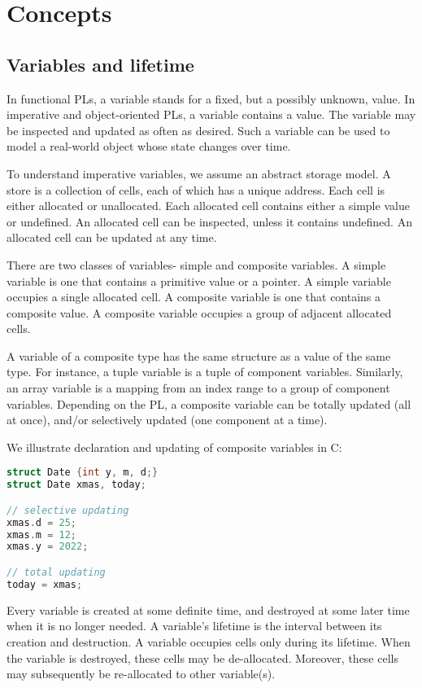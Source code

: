 \documentclass[a4paper, openany]{memoir}
\begin{document}
\chapter{Concepts}

\section{Variables and lifetime}
In functional PLs, a variable stands for a fixed, but a possibly unknown, value. In imperative and object-oriented PLs, a variable contains a value. The variable may be inspected and updated as often as desired. Such a variable can be used to model a real-world object whose state changes over time.

To understand imperative variables, we assume an abstract storage model. A store is a collection of cells, each of which has a unique address. Each cell is either allocated or unallocated. Each allocated cell contains either a simple value or undefined. An allocated cell can be inspected, unless it contains undefined. An allocated cell can be updated at any time.

There are two classes of variables- simple and composite variables. A simple variable is one that contains a primitive value or a pointer. A simple variable occupies a single allocated cell. A composite variable is one that contains a composite value. A composite variable occupies a group of adjacent allocated cells.

A variable of a composite type has the same structure as a value of the same type. For instance, a tuple variable is a tuple of component variables. Similarly, an array variable is a mapping from an index range to a group of component variables. Depending on the PL, a composite variable can be totally updated (all at once), and/or selectively updated (one component at a time).

We illustrate declaration and updating of composite variables in C:
\begin{lstlisting}[language=C]
struct Date {int y, m, d;}
struct Date xmas, today;

// selective updating
xmas.d = 25;
xmas.m = 12;
xmas.y = 2022;

// total updating
today = xmas;
\end{lstlisting}

Every variable is created at some definite time, and destroyed at some later time when it is no longer needed. A variable's lifetime is the interval between its creation and destruction. A variable occupies cells only during its lifetime. When the variable is destroyed, these cells may be de-allocated. Moreover, these cells may subsequently be re-allocated to other variable(s).
\end{document}
